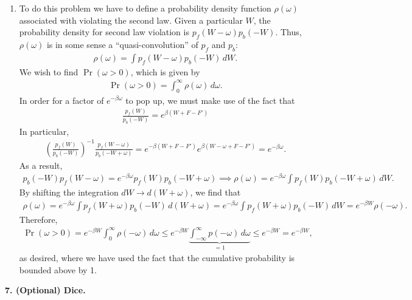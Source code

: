 \documentclass{article}
\theoremstyle{definition}
\newcommand{\be}{\beta}
\newcommand{\f}[2]{\frac{#1}{#2}}
\newcommand{\lp}{\left(}
\newcommand{\rp}{\right)}
\begin{document}
\begin{enumerate}[label=(\alph*)]
	
	\item To do this problem we have to define a probability density function $\rho(\omega)$ associated with violating the second law. Given a particular $W$, the probability density for second law violation is $p_f(W-\omega)p_b(-W)$. Thus, $\rho(\omega)$ is in some sense a ``quasi-convolution'' of $p_f$ and $p_b$:
	\begin{align*}
	\rho(\omega) = \int p_f(W-\omega)p_b(-W)\,dW.
	\end{align*}  
	We wish to find $\Pr(\omega>0)$, which is given by 
	\begin{align*}
	\Pr(\omega>0) = \int_0^\infty \rho (\omega)\,d\omega.
	\end{align*}
	In order for a factor of $e^{-\be\omega}$ to pop up, we must make use of the fact that 
	\begin{align*}
	\f{p_f(W)}{p_b(-W)} = e^{\be(W+F-F')}
	\end{align*}
	In particular, 
	\begin{align*}
	\lp \f{p_f(W)}{p_b(-W)}\rp^{-1}  \f{p_f(W-\omega)}{p_b(-W+\omega)} = e^{-\be(W+F-F')} e^{\be(W-\omega+F-F')} = e^{-\be\omega}.
	\end{align*}
	As a result,
	\begin{align*}
	p_b(-W) p_f(W-\omega) = e^{-\be\omega} p_f(W) p_b(-W+\omega) \implies \rho(\omega) = e^{-\be\omega} \int p_f(W) p_b(-W+\omega)\,dW.
	\end{align*}
	By shifting the integration $dW \to d(W+\omega)$, we find that
	\begin{align*}
	\rho(\omega) = e^{-\be \omega} \int p_f(W+\omega) p_b(-W)\, d(W+\omega) =  e^{-\be \omega} \int p_f(W+\omega) p_b(-W)\, dW = e^{-\be W} \rho(-\omega).
	\end{align*}
	Therefore, 
	\begin{align*}
	\Pr(\omega>0) = e^{-\be W} \int_0^\infty \rho(-\omega)\,d\omega \leq e^{-\be W} \underbrace{\int_{-\infty}^\infty p(-\omega)\,d\omega}_{=1} \leq e^{-\be W} = e^{-\be W},
	\end{align*}
	as desired, where we have used the fact that the cumulative probability is bounded above by 1. 
	
\end{enumerate}


\noindent \textbf{7. (Optional) Dice. }
\end{document}

